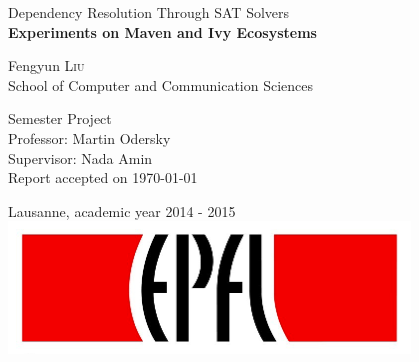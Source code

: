 \begin{titlepage}

  \begin{center}

    \vspace*{3\baselineskip}
    {\Large Dependency Resolution Through SAT Solvers \\[0.4cm] }
    {\bfseries Experiments on Maven and Ivy Ecosystems\\[1.5cm] }

    \noindent
    Fengyun \textsc{Liu} \\[0.3cm]

    \noindent
    {School of Computer and Communication Sciences \\[2cm]}

    \begin{framed}
    Semester Project \\
    Professor: Martin Odersky \\
    Supervisor: Nada Amin \\
    Report accepted on \today
    \end{framed}

    \noindent
    Lausanne, academic year 2014 - 2015 \\[1cm]

    \includegraphics[width=0.8\textwidth]{img/epfl}~\\[1cm]



  \end{center}

\end{titlepage}
